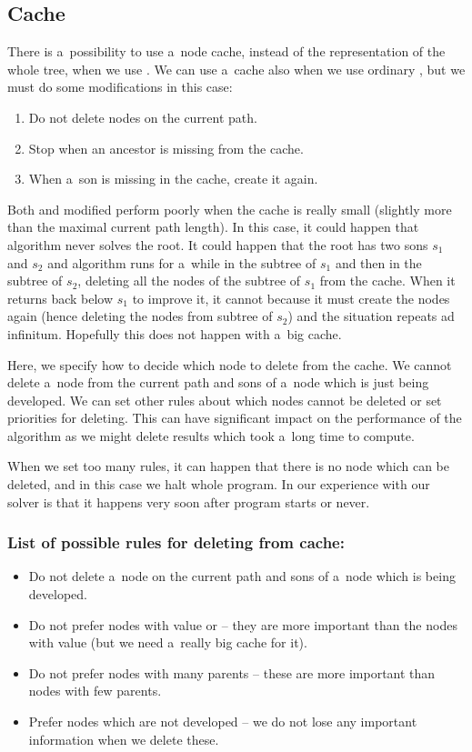 \subsection{Cache}

There is a~possibility to use a~node cache, instead of the representation of the whole
tree, when we use .
We can use a~cache also when we use ordinary , but we must
do some modifications in this case: 

\begin{enumerate}
\item Do not delete nodes on the current path.
\item Stop  when an ancestor is missing from the cache.
\item When a~son is missing in the cache, create it again.
\end{enumerate}

Both  and modified  perform poorly when the
cache is really small (slightly more than the maximal current path length). In
this case, it could happen that algorithm never solves the root. It could happen
that the root has two sons $s_1$ and $s_2$  and algorithm runs for a~while in
the subtree of $s_1$ and then in the subtree of $s_2$, deleting all the nodes
of the subtree of $s_1$ from the cache. When it returns back below $s_1$ to
improve it, it cannot because it must create the nodes again (hence deleting
the nodes from subtree of $s_2$) and the situation repeats ad infinitum.
Hopefully this does not happen with a~big cache.

Here, we specify how to decide which node to delete from the cache. We cannot
delete a~node from the current path and sons of a~node which is just being
developed. We can set other rules about which nodes cannot be deleted or set
priorities for deleting. This can have significant impact on the performance of
the algorithm as we might delete results which took a~long time to compute.

When we set too many rules, it can happen that there is no node which can be
deleted, and in this case we halt whole program. In our experience with our
solver is that it happens very soon after program starts or never.

\subsubsection{List of possible rules for deleting from cache:}
\begin{itemize}
\item Do not delete a~node on the current path and sons of a~node which is being developed.
\item Do not prefer nodes with value  or  -- they are 
more important than the nodes with value  (but we need a~really big
		cache for it).
\item Do not prefer nodes with many parents -- these are more important than nodes
with few parents.
\item Prefer nodes which are not developed -- we do not lose any important information
when we delete these. 
\end{itemize}

